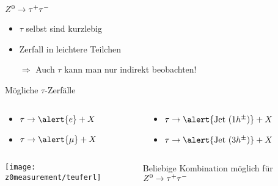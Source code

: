  \begin{frame}
   \frametitle{$Z^{0}\rightarrow \tau^{+}\tau^{-}$}
   \begin{itemize}
   \item $\tau$ selbst sind kurzlebig
   \item Zerfall in leichtere Teilchen
   \item[$\Rightarrow$] Auch $\tau$ kann man nur indirekt beobachten!
   \end{itemize}
   \pause
   \begin{block}{M\"ogliche $\tau$-Zerf\"alle}
     \begin{columns}
       \begin{column}{0.5\textwidth}
         \begin{itemize}
           \pause
         \item $\tau \rightarrow \alert{e} + X$
           \pause
         \item $\tau \rightarrow \alert{\mu} + X$
        \end{itemize}
       \end{column}
       \begin{column}{0.5\textwidth}
         \begin{itemize}
           \pause
         \item $\tau \rightarrow \alert{\text{Jet }(1h^{\pm})} + X$
           \pause
         \item $\tau \rightarrow \alert{\text{Jet }(3h^{\pm})} + X$
         \end{itemize}
       \end{column}
     \end{columns}
   \end{block}
   \pause
   \vskip0.5cm
   \begin{columns}
     \begin{column}{0.2\textwidth}
       \centering
       \texttt{[image: z0measurement/teuferl]}
     \end{column}
     \begin{column}{0.8\textwidth}
       \alert{Beliebige Kombination m\"oglich f\"ur $Z^{0}\rightarrow \tau^{+}\tau^{-}$}
     \end{column}     
   \end{columns}
 \end{frame}

